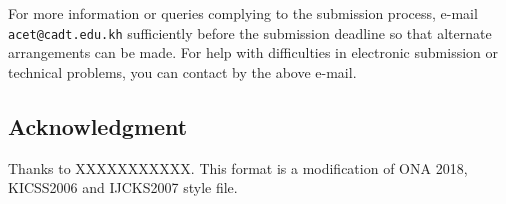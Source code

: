 \documentclass[11pt,a4paper]{article}
\begin{document}
For more information or queries complying to the submission process,
e-mail {\tt acet@cadt.edu.kh} sufficiently before the submission
deadline so that alternate arrangements can be made.  For help with
difficulties in electronic submission or technical problems, you can
contact by the above e-mail.

\subsection*{Acknowledgment}

Thanks to XXXXXXXXXXX.  This format is a modification of ONA 2018, KICSS2006 
and IJCKS2007 style file.




\end{document}
